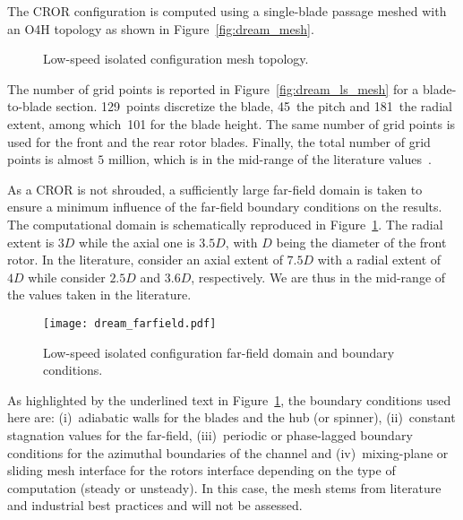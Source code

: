 
The CROR configuration is computed using
a single-blade passage meshed
with an O4H topology as shown in Figure~\ref{fig:dream_mesh}.
\begin{figure}[htp]
  \centering
  \caption{Low-speed isolated configuration mesh topology.}
\end{figure}
The number of grid points is reported in 
Figure~\ref{fig:dream_ls_mesh} for a blade-to-blade section. 
129~points discretize the blade, 45~the pitch and 181~the radial
extent, among which~101 for the blade height. 
The same number of grid points is used for the front
and the rear rotor blades. 
Finally, the total number of grid points is almost $5$ million, which
is in the mid-range of the literature 
values~\cite{Stuermer2008,Bechet2011,
Francois2013,Zachariadis2011,Peters2012}.

As a CROR is not shrouded, a sufficiently large
far-field domain is taken to ensure a minimum influence
of the far-field boundary conditions on the results.
The computational domain is schematically reproduced 
in Figure~\ref{fig:dream_farfield}.
The radial extent is $3D$ while the axial one is $3.5D$, with
$D$ being the diameter of the front rotor.
In the literature, 
\citet{Peters2012} consider an axial extent of $7.5D$
with a radial extent of $4D$ while \citet{Zachariadis2011}
consider $2.5D$ and $3.6D$, respectively. We are thus in 
the mid-range of the values taken in the literature.
\begin{figure}[htp]
  \centering
  \texttt{[image: dream\_farfield.pdf]}
  \caption{Low-speed isolated configuration far-field domain and boundary conditions.}
  \label{fig:dream_farfield}
\end{figure}
As highlighted by the underlined text in Figure~\ref{fig:dream_farfield},
the boundary conditions used here are: (i)~adiabatic walls
for the blades and the hub (or spinner), (ii)~constant
stagnation values for the far-field, (iii)~periodic
or phase-lagged boundary conditions 
for the azimuthal boundaries of the channel
and (iv)~mixing-plane or sliding mesh interface for the
rotors interface depending on the type of computation (steady or unsteady).
In this case,
the mesh stems from literature and industrial best
practices and will not be assessed.


